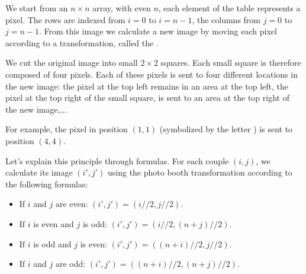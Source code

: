 \documentclass[11pt,class=report,crop=false]{standalone}
\begin{document}




\begin{cours}

We start from an $n\times n$ array, with even $n$, each element of the table represents a pixel. The rows are indexed from $i=0$ to $i=n-1$, the columns from $j=0$ to $j=n-1$.
From this image we calculate a new image by moving each pixel according to a transformation, called the .

We cut the original image into small $2\times2$ squares.
Each small square is therefore composed of four pixels. Each of these pixels is sent to four different locations in the new image:
the pixel at the top left remains in an area at the top left, the pixel at the top right of the small square, is sent to an area at the top right of the new image,...


For example, the pixel in position $(1,1)$ (symbolized by the letter ) is sent to position $(4,4)$.

\medskip

Let's explain this principle through formulas. For each couple $(i,j)$, we calculate its image $(i',j')$ using the photo booth transformation according to the following formulas:
\begin{itemize}
  \item If $i$ and $j$ are even: $(i',j') = (i//2,j//2)$.
  \item If $i$ is even and $j$ is odd: $(i',j') = (i//2,(n+j)//2)$.  
  \item If $i$ is odd and $j$ is even: $(i',j') = ((n+i)//2,j//2)$.
  \item If $i$ and $j$ are odd: $(i',j') = ((n+i)//2,(n+j)//2)$.
\end{itemize}


\medskip


\end{cours}
\end{document}

